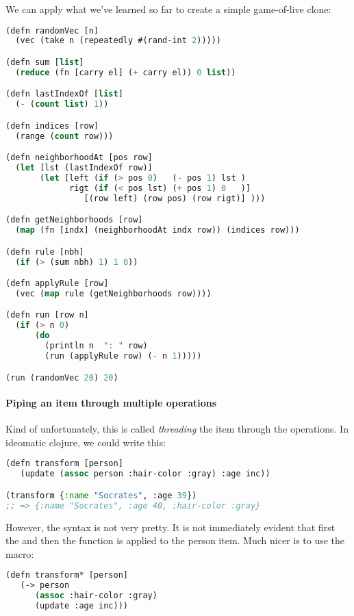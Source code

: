 We can apply what we've learned so far to create a simple game-of-live clone: 
\begin{lstlisting}[language=lisp]
(defn randomVec [n]
  (vec (take n (repeatedly #(rand-int 2)))))

(defn sum [list]
  (reduce (fn [carry el] (+ carry el)) 0 list))

(defn lastIndexOf [list] 
  (- (count list) 1))

(defn indices [row]
  (range (count row)))

(defn neighborhoodAt [pos row] 
  (let [lst (lastIndexOf row)]
       (let [left (if (> pos 0)   (- pos 1) lst )
             rigt (if (< pos lst) (+ pos 1) 0   )]
                [(row left) (row pos) (row rigt)] )))

(defn getNeighborhoods [row] 
  (map (fn [indx] (neighborhoodAt indx row)) (indices row)))

(defn rule [nbh]
  (if (> (sum nbh) 1) 1 0))

(defn applyRule [row]
  (vec (map rule (getNeighborhoods row))))

(defn run [row n]
  (if (> n 0) 
      (do
        (println n  ": " row)
        (run (applyRule row) (- n 1)))))

(run (randomVec 20) 20)
\end{lstlisting}


\paragraph{Piping an item through multiple operations}
Kind of unfortunately, this is called \emph{threading} the item through the operations. In ideomatic clojure, we could write this: 

\begin{lstlisting}[language=lisp]
(defn transform [person]
   (update (assoc person :hair-color :gray) :age inc))

(transform {:name "Socrates", :age 39})
;; => {:name "Socrates", :age 40, :hair-color :gray}
\end{lstlisting}

However, the syntax is not very pretty. It is not immediately evident that first the  and then the  function is applied to the person item. Much nicer is to use the \inlinecode{->} macro:

\begin{lstlisting}[language=lisp]
(defn transform* [person]
   (-> person
      (assoc :hair-color :gray)
      (update :age inc)))
\end{lstlisting}

